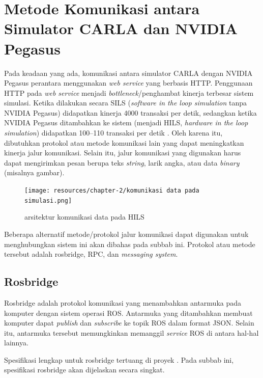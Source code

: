 \section{Metode Komunikasi antara Simulator CARLA dan NVIDIA Pegasus}

Pada keadaan yang ada, komunikasi antara simulator CARLA dengan NVIDIA Pegasus
perantara menggunakan \textit{web service} yang berbasis HTTP. Penggunaan HTTP
pada \textit{web service} menjadi \textit{bottleneck}/penghambat kinerja
terbesar sistem simulasi. Ketika dilakukan secara SILS (\textit{software in the
      loop simulation} tanpa NVIDIA Pegasus) didapatkan kinerja 4000 transaksi per
detik, sedangkan ketika NVIDIA Pegasus ditambahkan ke sistem (menjadi HILS,
\textit{hardware in the loop simulation}) didapatkan 100--110 transaksi per
detik \parencite{trilaksono_laporanRispro}. Oleh karena itu, dibutuhkan protokol
atau metode komunikasi lain yang dapat meningkatkan kinerja jalur komunikasi.
Selain itu, jalur komunikasi yang digunakan harus dapat mengirimkan pesan berupa
teks \textit{string}, larik angka, atau data \textit{binary} (misalnya gambar).

\begin{figure}
      \begin{center}
            \texttt{[image: resources/chapter-2/komunikasi
                  data pada simulasi.png]}
            \caption{arsitektur komunikasi data pada HILS \parencite{trilaksono_laporanRispro}}
      \end{center}
\end{figure}

Beberapa alternatif metode/protokol jalur komunikasi dapat digunakan untuk
meng\-hu\-bung\-kan sistem ini akan dibahas pada subbab ini. Protokol atau
metode tersebut adalah rosbridge, RPC, dan \textit{messaging system}.

\subsection{Rosbridge}

Rosbridge adalah protokol komunikasi yang menambahkan antarmuka pada komputer
dengan sistem operasi ROS. Antarmuka yang ditambahkan membuat komputer dapat
\textit{publish} dan \textit{subscribe} ke topik ROS dalam format JSON. Selain
itu, antarmuka tersebut memungkinkan memanggil \textit{service} ROS di antara
hal-hal lainnya.

Spesifikasi lengkap untuk rosbridge tertuang di proyek \parencite{ros_bridge}.
Pada subbab ini, spesifikasi rosbridge akan dijelaskan secara singkat.


